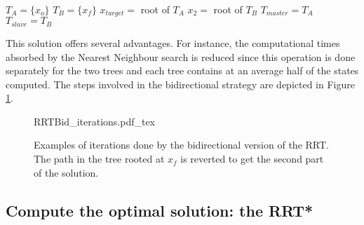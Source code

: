 \begin{algorithm}
 \caption{Bidirectional RRT. A deterministic bias is introduced for accelerating the steps.
 The probability $\sigma$ regulates the frequency adopted for trying the deterministic extension. 
 The Revert procedure behaves as exposed in Figure \ref{fig:RRTBid_single}.
 \label{alg:RRT_bid}}
 $T_A = \lbrace x_o \rbrace$\; 
 $T_B = \lbrace x_f \rbrace$\; 
 $x_{target} = $ root of $T_A$\;
 $x_2 = $ root of $T_B$\;
 $T_{master} = T_A$\; 
 $T_{slave} = T_B$\;
\end{algorithm}


 This solution offers several advantages. For instance, the computational times absorbed by the Nearest Neighbour search is reduced since this operation is done separately for the two trees and each tree contains at an average half of the states computed. The steps involved in the bidirectional strategy are depicted in Figure \ref{fig:RRTBid_single}.

 \begin{figure}
	 \centering
 \def\svgwidth{0.85 \columnwidth}
 {RRTBid_iterations.pdf_tex} 
	 \caption{Examples of iterations done by the bidirectional version of the RRT. The path in the tree rooted at $x_f$ is reverted to get the second part of the solution.}
 \label{fig:RRTBid_single}
 \end{figure}
 

\subsection{Compute the optimal solution: the RRT*}
\label{sec:RRT_star}

